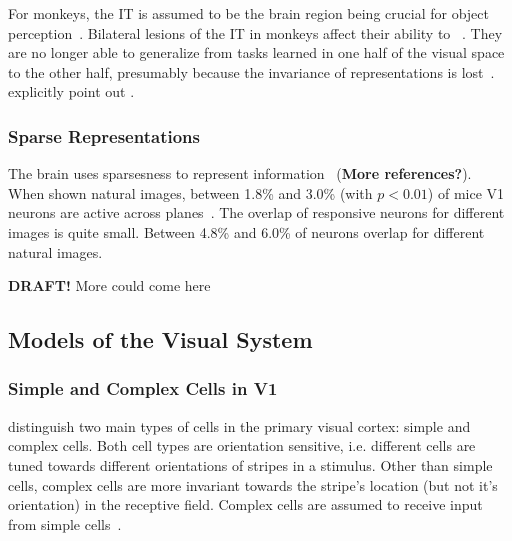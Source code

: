 For monkeys, the \ac{IT} is assumed to be the brain region being crucial for object perception~\citep[pp. 1070, 1071]{squire2012fundamental}.
Bilateral lesions of the \ac{IT} in monkeys affect their ability to ~\citep[p. 1070]{squire2012fundamental}.
They are no longer able to generalize from tasks learned in one half of the visual space to the other half, presumably because the invariance of representations is lost~\citep[p. 1070]{squire2012fundamental}.
\citet[p. 1071]{squire2012fundamental} explicitly point out .

\subsubsection{Sparse Representations}\label{subsubsec:sparse_representations}

The brain uses sparsesness to represent information~\citep{yoshida2020natural} (\textbf{More references?}).
When shown natural images, between 1.8\% and 3.0\% (with $p < 0.01$) of mice \ac{V1} neurons are active across planes~\citep{yoshida2020natural}.
The overlap of responsive neurons for different images is quite small.
Between 4.8\% and 6.0\% of neurons overlap for different natural images.

\textbf{DRAFT!} More could come here

\subsection{Models of the Visual System}

\subsubsection{Simple and Complex Cells in \ac{V1}}\label{subsubseq:simple_complex_cells}

\citet{hubel1962receptive} distinguish two main types of cells in the primary visual cortex: simple and complex cells.
Both cell types are orientation sensitive, i.e. different cells are tuned towards different orientations of stripes in a stimulus.
Other than simple cells, complex cells are more invariant towards the stripe's location (but not it's orientation) in the receptive field.
Complex cells are assumed to receive input from simple cells~\citep{hubel1962receptive}.

